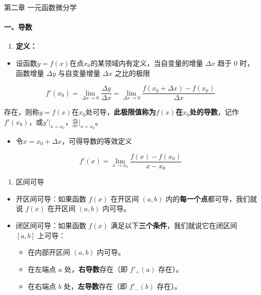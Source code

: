 \documentclass[
]{article}
\author{}
\date{}
\begin{document}
第二章 一元函数微分学

\paragraph{一、导数}\label{ux4e00ux5bfcux6570}

\begin{enumerate}
\def\labelenumi{\arabic{enumi}.}
\item
  \textbf{定义：}
\end{enumerate}

\begin{itemize}
\item
  设函数\(y=f(x)\)在点\(x_0\)的某领域内有定义，当自变量的增量
  \(\Delta x\) 趋于 0 时，函数增量 \(\Delta y\) 与自变量增量
  \(\Delta x\) 之比的极限
\end{itemize}

\[f'(x_0) = \lim_{\Delta x \to 0} \frac{\Delta y}{\Delta x} = \lim_{\Delta x \to 0} \frac{f(x_0 + \Delta x) - f(x_0)}{\Delta x}\]

存在，则称\(y=f(x)\)在\(x_0\)处可导，\textbf{此极限值称为\(f(x)\)在\(x_0\)处的导数}，记作\(f'(x_0)\)，或\(y'|_{x=x_0}\)，\(\frac {dy}{dx}|_{x=x_0}\)。

\begin{itemize}
\item
  令\(x=x_0+\Delta x\)，可得导数的等效定义
\end{itemize}

\[f'(x)=\lim_{x \to x_0} \frac {f(x)-f(x_0)}{x-x_0}\]

\begin{enumerate}
\def\labelenumi{\arabic{enumi}.}
\item
  区间可导
\end{enumerate}

\begin{itemize}
\item
  开区间可导：如果函数 \(f(x)\) 在开区间 \((a, b)\)
  内的\textbf{每一个点}都可导，我们就说 \(f(x)\) 在开区间 \((a, b)\)
  内可导。
\item
  闭区间可导：如果函数 \(f(x)\)
  满足以下\textbf{三个条件}，我们就说它在闭区间 \([a, b]\) 上可导：

  \begin{itemize}
  \item
    在内部开区间 \((a, b)\) 内可导。
  \item
    在左端点 \(a\) 处，\textbf{右导数}存在（即 \(f'_+(a)\) 存在）。
  \item
    在右端点 \(b\) 处，\textbf{左导数}存在（即 \(f'_-(b)\) 存在）。
  \end{itemize}
\end{itemize}
\end{document}
